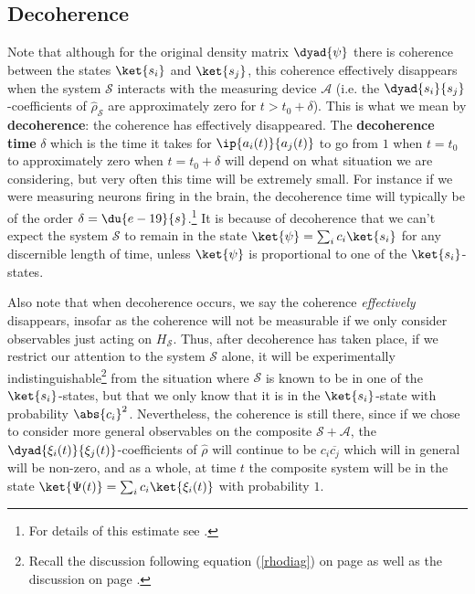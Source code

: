     \subsection{Decoherence}
    Note that although for the original density matrix $\dyad{\psi}$ there is coherence between the states $\ket{s_i}$ and $\ket{s_j}$, this coherence effectively  disappears when the system $\mathcal{S}$ interacts with the measuring device $\mathcal{A}$ (i.e. the $\dyad{s_i}{s_j}$-coefficients of $\hat{\rho}_\mathcal{S}$ are approximately zero for $t> t_0+\delta$). This is what we mean by \textbf{decoherence}: the coherence has effectively disappeared. The \textbf{decoherence time} $\delta$ which is the time it takes for $\ip{a_i(t)}{a_j(t)}$ to go from $1$ when $t=t_0$ to approximately zero when $t=t_0+\delta$ will depend on what situation we are considering, but very often this time will be extremely small. For instance if we were measuring neurons firing in the brain, the decoherence time will typically be of the order $\delta =\du{e-19}{s}$.\footnote{For details of this estimate see \cite[370]{Schlosshauer}.} It is because of decoherence that we can't expect the system $\mathcal{S}$ to remain in the state $\ket{\psi}=\sum_i c_i\ket{s_i}$ for any discernible length of time, unless $\ket{\psi}$ is proportional to one of the $\ket{s_i}$-states.  
    
    Also note that when decoherence occurs, we say the coherence \emph{effectively} disappears, insofar as the coherence will not be measurable if we only consider observables just acting on $H_\mathcal{S}$. Thus, after decoherence has taken place, if we restrict our attention to the system $\mathcal{S}$ alone, it will be experimentally indistinguishable\footnote{Recall the discussion following equation (\ref{rhodiag}) on page \pageref{rhodiag} as well as the discussion on page \pageref{subtle}.} from the situation where $\mathcal{S}$ is known to be in one of the $\ket{s_i}$-states, but that we only know that it is in the $\ket{s_i}$-state with probability $\abs{c_i}^2$. Nevertheless, the coherence is still there, since if we chose to consider more general observables on the composite $\mathcal{S}+\mathcal{A}$, the $\dyad{\xi_i(t)}{\xi_j(t)}$-coefficients of $\hat{\rho}$ will continue to be $c_i\overline{c_j}$ which will in general will be non-zero, and as a whole, at time $t$ the composite system will be in the state $\ket{\Psi(t)}=\sum_i c_i\ket{\xi_i(t)}$ with probability $1$.
    
